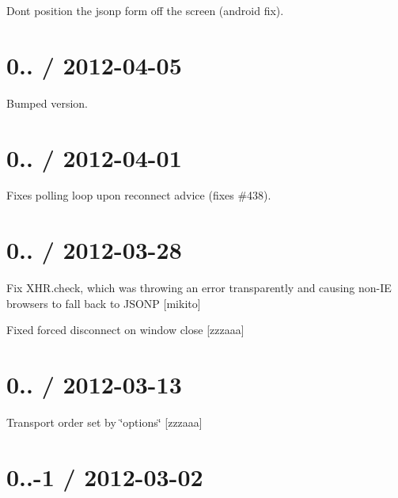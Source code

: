 \begin{DoxyItemize}
\item Don\textquotesingle{}t position the jsonp form off the screen (android fix).
\end{DoxyItemize}

\section*{0.. / 2012-\/04-\/05 }


\begin{DoxyItemize}
\item Bumped version.
\end{DoxyItemize}

\section*{0.. / 2012-\/04-\/01 }


\begin{DoxyItemize}
\item Fixes polling loop upon reconnect advice (fixes \#438).
\end{DoxyItemize}

\section*{0.. / 2012-\/03-\/28 }


\begin{DoxyItemize}
\item Fix X\+H\+R.\+check, which was throwing an error transparently and causing non-\/\+IE browsers to fall back to J\+S\+O\+NP \mbox{[}mikito\mbox{]}
\item Fixed forced disconnect on window close \mbox{[}zzzaaa\mbox{]}
\end{DoxyItemize}

\section*{0.. / 2012-\/03-\/13 }


\begin{DoxyItemize}
\item Transport order set by \char`\"{}options\char`\"{} \mbox{[}zzzaaa\mbox{]}
\end{DoxyItemize}

\section*{0..-\/1 / 2012-\/03-\/02 }


